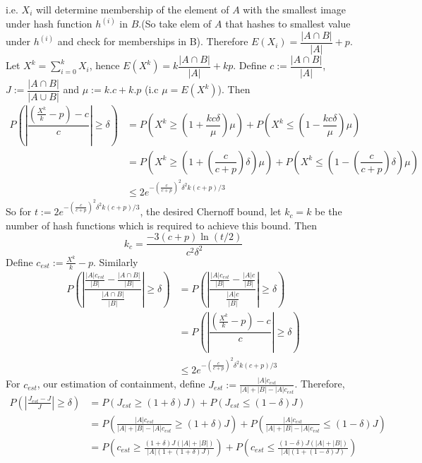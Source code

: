 \documentclass[11pt]{amsart}
\theoremstyle{remark}
\numberwithin{equation}{section}
\begin{document}
\begin{enumerate}
i.e. $X_i$ will determine membership of the element of $A$ with the smallest image under hash function $h^{(i)}$ in $B$.(So take elem of $A$ that hashes to smallest value under $h^{(i)}$ and check for memberships in B). Therefore $E(X_i)=\dfrac{|A\cap B|}{|A|}+p$. Let 
$X^k=\sum\limits_{i=0}^kX_i$, hence $ E(X^k)=k\dfrac{|A\cap B|}{|A|}+kp$. Define 
$c:= \dfrac{|A\cap B|}{|A|}$,  $J:= \dfrac{|A\cap B|}{|A\cup B|} $ and
$\mu:=k.c+k.p$ (i.c $\mu=E(X^k)$). Then
\begin{align*}
P\left(
\left|\dfrac{\left(\frac{X^k}{k}-p\right)-c}{c}\right|\geq \delta\right)
&=P\left(X^k\geq\left(1+\dfrac{kc\delta}{\mu}\right)\mu\right) +P\left(X^k\leq \left(1-\dfrac{kc\delta}{\mu}\right)\mu\right)\\
&=P\left( X^k\geq\left( 1+\left(\dfrac{c}{c+p}\right)\delta\right)\mu\right) + P\left(X^k\leq\left(1-\left(\dfrac{c}{c+p}\right)\delta\right)\mu\right)\\
&\leq 2e^{-\left(\frac{c}{c+p}\right)^2\delta^2k(c+p)/3}
\end{align*}
So for $t:=2e^{-\left(\frac{c}{c+p}\right)^2\delta^2k(c+p)/3}$, the desired Chernoff bound, let $k_c=k$ be the number of hash functions which is required to achieve this bound. Then 
$$k_c=\dfrac{-3(c+p)\ln(t/2)}{c^2\delta^2}$$
Define $c_{est}:=\frac{X^k}{k}-p$. Similarly 
\begin{align*}
 P\left(
\left|\dfrac{\frac{|A|c_{est}}{|B|}-\frac{|A\cap B|}{|B|}}{\frac{|A\cap B|}{|B|}}\right|\geq \delta\right)
&=P\left(
\left|\dfrac{\frac{|A|c_{est}}{|B|}-\frac{|A|c}{|B|}}{\frac{|A|c}{|B|}}\right|\geq \delta\right)\\
&=P\left(
\left|\dfrac{\left(\frac{X^k}{k}-p\right)-c}{c}\right|\geq \delta\right)\\
&\leq 2e^{-\left(\frac{c}{c+p}\right)^2\delta^2k(c+p)/3}
\end{align*}
For $c_{est}$, our estimation of containment, define $J_{est}:=\frac{|A|c_{est}}{|A|+|B|-|A|c_{est}}$. Therefore,
\begin{align*}
P\left(\left|\frac{J_{est}-J}{J}\right|\geq \delta\right) &= P(J_{est}\geq (1+\delta)J)+P(J_{est}\leq (1-\delta)J)\\
&= P\left(\frac{|A|c_{est}}{|A|+|B|-|A|c_{est}}\geq (1+\delta)J\right)+P\left(\frac{|A|c_{est}}{|A|+|B|-|A|c_{est}}\leq (1-\delta)J\right)\\
&= P\left(c_{est}\geq\frac{ (1+\delta)J(|A|+|B|)}{|A|(1+(1+\delta)J)} \right)+P\left(c_{est}\leq\frac{ (1-\delta)J(|A|+|B|)}{|A|(1+(1-\delta)J)} \right)\\

\end{align*}
\end{enumerate}
\end{document}
